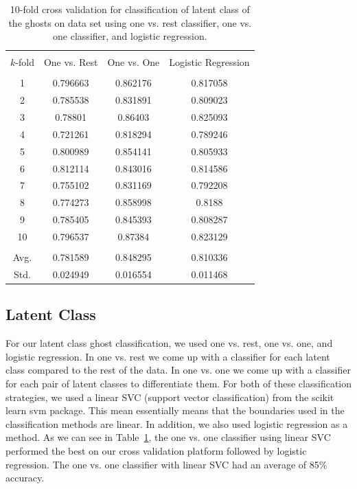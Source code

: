 \documentclass[11pt]{amsart}
\begin{document}
\begin{table}[b]
\caption{10-fold cross validation for classification of latent class of the ghosts on data set using one vs. rest classifier, one vs. one classifier, and logistic regression.}
\centering
\begin{tabular}{c  c  c  c}
\hline \hline \\ 
$k$-fold & One vs. Rest & One vs. One & Logistic Regression \\ [0.5ex]
\hline \\ 
1 & 0.796663 & 0.862176 & 0.817058 \\
2 & 0.785538 & 0.831891 & 0.809023 \\
3 & 0.78801 & 0.86403 & 0.825093 \\
4 & 0.721261 & 0.818294 & 0.789246 \\
5 & 0.800989 & 0.854141 & 0.805933 \\
6 & 0.812114 & 0.843016 & 0.814586 \\
7 & 0.755102 & 0.831169 & 0.792208 \\
8 & 0.774273 & 0.858998 & 0.8188 \\
9 & 0.785405 & 0.845393 & 0.808287 \\
10 & 0.796537 & 0.87384 & 0.823129 \\
\hline \\
Avg. & 0.781589 & 0.848295 & 0.810336 \\
Std. & 0.024949 & 0.016554 & 0.011468 \\
\hline
\end{tabular}
\label{table:latent_class}
\end{table}

\subsection{Latent Class}

For our latent class ghost classification, we used one vs. rest, one vs. one, and logistic regression. In one vs. rest we come up with a classifier for each latent class compared to the rest of the data. In one vs. one we come up with a classifier for each pair of latent classes to differentiate them. For both of these classification strategies, we used a linear SVC (support vector classification) from the scikit learn svm package. This mean essentially means that the boundaries used in the classification methods are linear. In addition, we also used logistic regression as a method. As we can see in Table~\ref{table:latent_class}, the one vs. one classifier using linear SVC performed the best on our cross validation platform followed by logistic regression. The one vs. one classifier with linear SVC had an average of 85\% accuracy.
\end{document}
